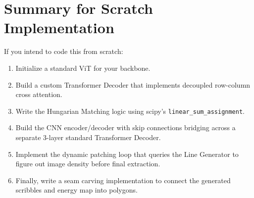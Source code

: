 \documentclass[12pt,a4paper]{article}
\begin{document}
\section{Summary for Scratch Implementation}
If you intend to code this from scratch:
\begin{enumerate}
    \item Initialize a standard ViT for your backbone.
    \item Build a custom Transformer Decoder that implements decoupled row-column cross attention.
    \item Write the Hungarian Matching logic using scipy's \texttt{linear\_sum\_assignment}.
    \item Build the CNN encoder/decoder with skip connections bridging across a separate 3-layer standard Transformer Decoder.
    \item Implement the dynamic patching loop that queries the Line Generator to figure out image density before final extraction.
    \item Finally, write a seam carving implementation to connect the generated scribbles and energy map into polygons.
\end{enumerate}
\end{document}
